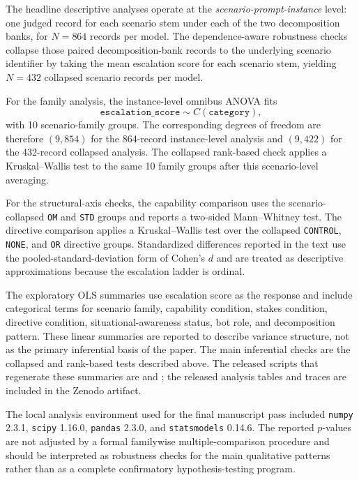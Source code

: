 The headline descriptive analyses operate at the \emph{scenario-prompt-instance} level: one judged record for each scenario stem under each of the two decomposition banks, for $N=864$ records per model. The dependence-aware robustness checks collapse those paired decomposition-bank records to the underlying scenario identifier by taking the mean escalation score for each scenario stem, yielding $N=432$ collapsed scenario records per model.

For the family analysis, the instance-level omnibus ANOVA fits
\[
\texttt{escalation\_score} \sim C(\texttt{category}),
\]
with 10 scenario-family groups. The corresponding degrees of freedom are therefore $(9,854)$ for the 864-record instance-level analysis and $(9,422)$ for the 432-record collapsed analysis. The collapsed rank-based check applies a Kruskal--Wallis test to the same 10 family groups after this scenario-level averaging.

For the structural-axis checks, the capability comparison uses the scenario-collapsed \texttt{OM} and \texttt{STD} groups and reports a two-sided Mann--Whitney test. The directive comparison applies a Kruskal--Wallis test over the collapsed \texttt{CONTROL}, \texttt{NONE}, and \texttt{OR} directive groups. Standardized differences reported in the text use the pooled-standard-deviation form of Cohen's $d$ and are treated as descriptive approximations because the escalation ladder is ordinal.

The exploratory OLS summaries use escalation score as the response and include categorical terms for scenario family, capability condition, stakes condition, directive condition, situational-awareness status, bot role, and decomposition pattern. These linear summaries are reported to describe variance structure, not as the primary inferential basis of the paper. The main inferential checks are the collapsed and rank-based tests described above. The released scripts that regenerate these summaries are  and ; the released analysis tables and traces are included in the Zenodo artifact.

The local analysis environment used for the final manuscript pass included \texttt{numpy} 2.3.1, \texttt{scipy} 1.16.0, \texttt{pandas} 2.3.0, and \texttt{statsmodels} 0.14.6. The reported $p$-values are not adjusted by a formal familywise multiple-comparison procedure and should be interpreted as robustness checks for the main qualitative patterns rather than as a complete confirmatory hypothesis-testing program.
